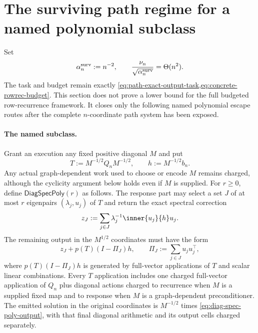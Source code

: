 \section{The surviving path regime for a named polynomial subclass}
\label{sec:surviving-path-polynomial}

Set
\begin{equation}
 \alpha_n^{\rm surv}:=n^{-2},
 \qquad
 \frac{\nu_n}{\sqrt{\alpha_n^{\rm surv}}}
 =\Theta(n^2).
 \label{eq:surviving-path-regime}
\end{equation}
The task and budget remain exactly
\cref{eq:path-exact-output-task,eq:concrete-rowrec-budget}.  This section
does not prove a lower bound for the full budgeted row-recurrence framework.
It closes only the following named polynomial escape routes after the complete
$n$-coordinate path system has been exposed.

\paragraph{The named subclass.}
Grant an execution any fixed positive diagonal $M$ and put
\begin{equation}
 T:=M^{-1/2}Q_nM^{-1/2},
 \qquad h:=M^{-1/2}b_n.
 \label{eq:diagonal-krylov-transform}
\end{equation}
Any actual graph-dependent work used to choose or encode $M$ remains charged,
although the cyclicity argument below holds even if $M$ is supplied.
For $r\geq0$, define
$\mathsf{DiagSpecPoly}(r)$ as follows.  The response part may select a set
$J$ of at most $r$ eigenpairs $(\lambda_j,u_j)$ of $T$ and return the exact
spectral correction
\begin{equation}
 z_J:=\sum_{j\in J}\lambda_j^{-1}
       \inner{u_j}{h}u_j.
 \label{eq:spectral-atom-correction}
\end{equation}
The remaining output in the $M^{1/2}$ coordinates must have the form
\begin{equation}
 z_J+p(T)(I-\Pi_J)h,
 \qquad
 \Pi_J:=\sum_{j\in J}u_ju_j^\top,
 \label{eq:diag-spec-poly-output}
\end{equation}
where $p(T)(I-\Pi_J)h$ is generated by full-vector applications of $T$ and
scalar linear combinations.  Every $T$ application includes one charged
full-vector application of $Q_n$ plus diagonal actions charged to recurrence
when $M$ is a supplied fixed map and to response when $M$ is a
graph-dependent preconditioner.  The emitted solution in the original
coordinates is $M^{-1/2}$ times
\cref{eq:diag-spec-poly-output}, with that final diagonal arithmetic and its
output cells charged separately.

